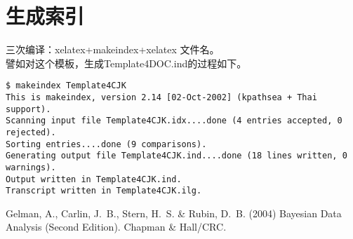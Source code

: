 \section{生成索引}
三次编译：xelatex+makeindex+xelatex  文件名。\\
\indent 譬如对这个模板，生成Template4DOC.ind的过程如下。
\begin{lstlisting}
$ makeindex Template4CJK
This is makeindex, version 2.14 [02-Oct-2002] (kpathsea + Thai support).
Scanning input file Template4CJK.idx....done (4 entries accepted, 0 rejected).
Sorting entries....done (9 comparisons).
Generating output file Template4CJK.ind....done (18 lines written, 0 warnings).
Output written in Template4CJK.ind.
Transcript written in Template4CJK.ilg.
\end{lstlisting}

\printindex %
\begin{thebibliography}{}
 Gelman, A., Carlin, J.~B., Stern, H.~S.  \& Rubin, D.~B. (2004)
Bayesian Data Analysis (Second Edition).  \newblock Chapman \& Hall/CRC.
\end{thebibliography}

\clearpage